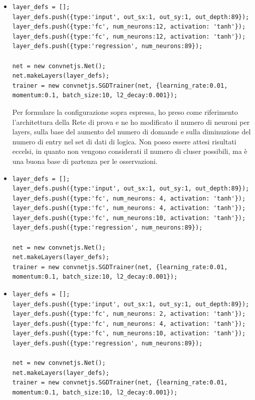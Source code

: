 \begin{itemize}
\item \begin{verbatim}
layer_defs = [];
layer_defs.push({type:'input', out_sx:1, out_sy:1, out_depth:89});
layer_defs.push({type:'fc', num_neurons:12, activation: 'tanh'});
layer_defs.push({type:'fc', num_neurons:12, activation: 'tanh'});
layer_defs.push({type:'regression', num_neurons:89});
        
net = new convnetjs.Net();
net.makeLayers(layer_defs);
trainer = new convnetjs.SGDTrainer(net, {learning_rate:0.01, 
momentum:0.1, batch_size:10, l2_decay:0.001});
\end{verbatim}
\noindent
Per formulare la configurazione sopra espressa, ho preso come riferimento l'architettura della Rete di prova e ne ho modificato il numero di neuroni per layers, sulla base del aumento del numero di domande e sulla diminuzione del numero di entry nel set di dati di logica. Non posso essere attesi risultati eccelsi, in quanto non vengono considerati il numero di cluser possibili, ma è una buona base di partenza per le osservazioni.
\item \begin{verbatim}
layer_defs = [];
layer_defs.push({type:'input', out_sx:1, out_sy:1, out_depth:89});
layer_defs.push({type:'fc', num_neurons: 4, activation: 'tanh'});
layer_defs.push({type:'fc', num_neurons: 4, activation: 'tanh'});
layer_defs.push({type:'fc', num_neurons:10, activation: 'tanh'});
layer_defs.push({type:'regression', num_neurons:89});
        
net = new convnetjs.Net();
net.makeLayers(layer_defs);
trainer = new convnetjs.SGDTrainer(net, {learning_rate:0.01, 
momentum:0.1, batch_size:10, l2_decay:0.001});
\end{verbatim}

\item \begin{verbatim}
layer_defs = [];
layer_defs.push({type:'input', out_sx:1, out_sy:1, out_depth:89});
layer_defs.push({type:'fc', num_neurons: 2, activation: 'tanh'});
layer_defs.push({type:'fc', num_neurons: 4, activation: 'tanh'});
layer_defs.push({type:'fc', num_neurons:10, activation: 'tanh'});
layer_defs.push({type:'regression', num_neurons:89});
        
net = new convnetjs.Net();
net.makeLayers(layer_defs);
trainer = new convnetjs.SGDTrainer(net, {learning_rate:0.01, 
momentum:0.1, batch_size:10, l2_decay:0.001});
\end{verbatim}


\end{itemize}
